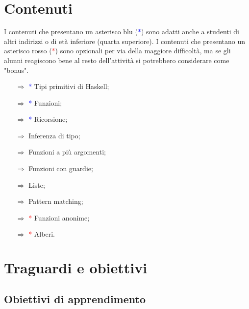 \section{Contenuti}

I contenuti che presentano un asterisco blu (\textcolor{blue}{*}) sono
adatti anche a studenti di altri indirizzi o di età inferiore (quarta superiore). I contenuti che presentano un asterisco rosso (\textcolor{red}{*}) sono
opzionali per via della maggiore difficoltà, ma se gli alunni reagiscono bene al resto dell'attività
si potrebbero considerare come "bonus".

\begin{itemize}
    \item [$\Rightarrow$] \textcolor{blue}{*} Tipi primitivi di Haskell;
    \item [$\Rightarrow$] \textcolor{blue}{*} Funzioni;
    \item [$\Rightarrow$] \textcolor{blue}{*} Ricorsione;
    \item [$\Rightarrow$] Inferenza di tipo;
    \item [$\Rightarrow$] Funzioni a più argomenti;
    \item [$\Rightarrow$] Funzioni con guardie;
    \item [$\Rightarrow$] Liste;
    \item [$\Rightarrow$] Pattern matching;
    \item [$\Rightarrow$] \textcolor{red}{*} Funzioni anonime;
    \item [$\Rightarrow$] \textcolor{red}{*} Alberi.
\end{itemize}
\section{Traguardi e obiettivi}

\subsection{Obiettivi di apprendimento}



